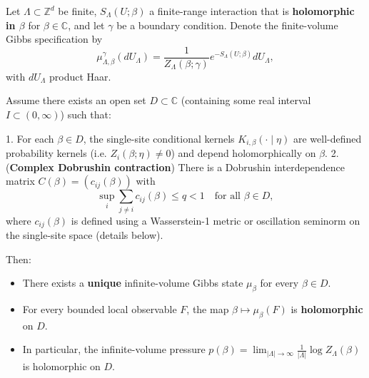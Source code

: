\begin{theorem}
\label{thm:global-analyticity-mixing}
Let $\Lambda\subset\mathbb Z^d$ be finite, $S_\Lambda(U;\beta)$ a finite-range interaction that is \textbf{holomorphic in $\beta$} for $\beta\in\mathbb C$, and let $\gamma$ be a boundary condition. Denote the finite-volume Gibbs specification by
\[
\mu_{\Lambda,\beta}^{\gamma}(dU_\Lambda) = \frac{1}{Z_{\Lambda}(\beta;\gamma)} e^{-S_\Lambda(U;\beta)} dU_\Lambda,
\]
with $dU_\Lambda$ product Haar.

Assume there exists an open set $D\subset\mathbb C$ (containing some real interval $I\subset(0,\infty)$) such that:

1. For each $\beta\in D$, the single-site conditional kernels $K_{i,\beta}(\cdot\mid \eta)$ are well-defined probability kernels (i.e. $Z_{{i}}(\beta;\eta)\neq 0$) and depend holomorphically on $\beta$.
2. (\textbf{Complex Dobrushin contraction}) There is a Dobrushin interdependence matrix $C(\beta)=(c_{ij}(\beta))$ with
   \[
   \sup_{i}\sum_{j\neq i} c_{ij}(\beta) \le q < 1
   \quad\text{for all }\beta\in D,
   \]
   where $c_{ij}(\beta)$ is defined using a Wasserstein-1 metric or oscillation seminorm on the single-site space (details below).

Then:
\begin{itemize}
\item There exists a \textbf{unique} infinite-volume Gibbs state $\mu_\beta$ for every $\beta\in D$.
\item For every bounded local observable $F$, the map $\beta\mapsto \mu_\beta(F)$ is \textbf{holomorphic} on $D$.
\item In particular, the infinite-volume pressure $p(\beta)=\lim_{|\Lambda|\to\infty}\frac1{|\Lambda|}\log Z_\Lambda(\beta)$ is holomorphic on $D$.
\end{itemize}
\end{theorem}

